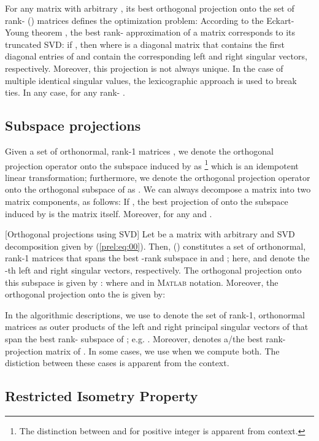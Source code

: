 \documentclass[twocolumn]{svjour3}
\begin{document}
For any matrix  with arbitrary , its best orthogonal projection  onto the set of rank- () matrices  defines the optimization problem:
 According to the Eckart-Young theorem \cite{horn1990matrix}, the best rank- approximation of a matrix  corresponds to its truncated SVD: if , then  where  is a diagonal matrix that contains the first  diagonal entries of  and  contain the corresponding left and right singular vectors, respectively. Moreover, this projection is not always unique. In the case of multiple identical singular values, the lexicographic approach is used to break ties. In any case,  for any rank- .

\subsection{Subspace projections}
Given a set of orthonormal, rank-1 matrices , we denote the orthogonal projection operator onto the subspace induced by  as \footnote{The distinction between  and  for  positive integer is apparent from context.} which is an idempotent linear transformation; furthermore, we denote the orthogonal projection operator onto the orthogonal subspace of  as . 
We can always decompose a matrix  into two matrix components, as follows:
 If , the best projection of  onto the subspace induced by  is the matrix  itself. Moreover,  for any  and .
\begin{definition}{\label{def:svd_proj}}[Orthogonal projections using SVD]
Let  be a matrix with arbitrary  and SVD decomposition given by (\ref{prel:eq:00}). Then,  () constitutes a set of orthonormal, rank-1 matrices that spans the best -rank subspace in  and ; here,  and  denote the -th left and right singular vectors, respectively. The orthogonal projection onto this subspace is given by \cite{candès2009exact}:
 where  and  in \textsc{Matlab} notation. Moreover, the orthogonal projection onto the  is given by:

\end{definition}

In the algorithmic descriptions, we use  to denote the set of rank-1, orthonormal matrices as outer products of the  left  and right  principal singular vectors of  that span the best rank- subspace of ; e.g. . Moreover,  denotes a/the best rank- projection matrix of . In some cases, we use  when we compute both. The distiction between these cases is apparent from the context.

\subsection{Restricted Isometry Property}
\end{document}
